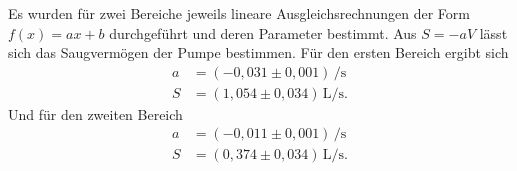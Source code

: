 Es wurden für zwei Bereiche jeweils lineare Ausgleichsrechnungen der Form $f(x)=ax+b$ durchgeführt und deren
Parameter bestimmt. Aus $S=-aV$ lässt sich das Saugvermögen der Pumpe bestimmen. Für den ersten Bereich ergibt
sich
\begin{align*}
  a &= (-0,031 \pm 0,001)\,\si{\per\second}\\
  S &= (1,054 \pm 0,034)\,\si{\liter\per\second}.
\end{align*}
Und für den zweiten Bereich
\begin{align*}
  a &= (-0,011 \pm 0,001)\,\si{\per\second}\\
  S &= (0,374 \pm 0,034)\,\si{\liter\per\second}.
\end{align*}